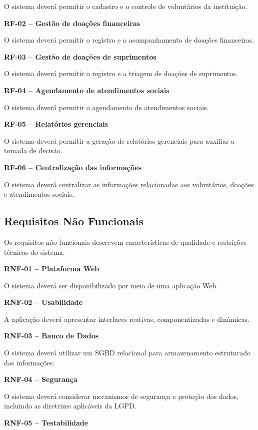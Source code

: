 \documentclass[12pt,a4paper]{article}
\begin{document}
O sistema deverá permitir o cadastro e o controle de voluntários da
instituição.

\textbf{RF-02 -- Gestão de doações financeiras}

O sistema deverá permitir o registro e o acompanhamento de doações
financeiras.

\textbf{RF-03 -- Gestão de doações de suprimentos}

O sistema deverá permitir o registro e a triagem de doações de
suprimentos.

\textbf{RF-04 -- Agendamento de atendimentos sociais}

O sistema deverá permitir o agendamento de atendimentos sociais.

\textbf{RF-05 -- Relatórios gerenciais}

O sistema deverá permitir a geração de relatórios gerenciais para
auxiliar a tomada de decisão.

\textbf{RF-06 -- Centralização das informações}

O sistema deverá centralizar as informações relacionadas aos
voluntários, doações e atendimentos sociais.


\subsection*{Requisitos Não Funcionais}

Os requisitos não funcionais descrevem características de qualidade e
restrições técnicas do sistema.

\textbf{RNF-01 -- Plataforma Web}

O sistema deverá ser disponibilizado por meio de uma aplicação Web.

\textbf{RNF-02 -- Usabilidade}

A aplicação deverá apresentar interfaces reativas, componentizadas e
dinâmicas.

\textbf{RNF-03 -- Banco de Dados}

O sistema deverá utilizar um SGBD relacional para armazenamento
estruturado das informações.

\textbf{RNF-04 -- Segurança}

O sistema deverá considerar mecanismos de segurança e proteção dos
dados, incluindo as diretrizes aplicáveis da LGPD.

\textbf{RNF-05 -- Testabilidade}
\end{document}
